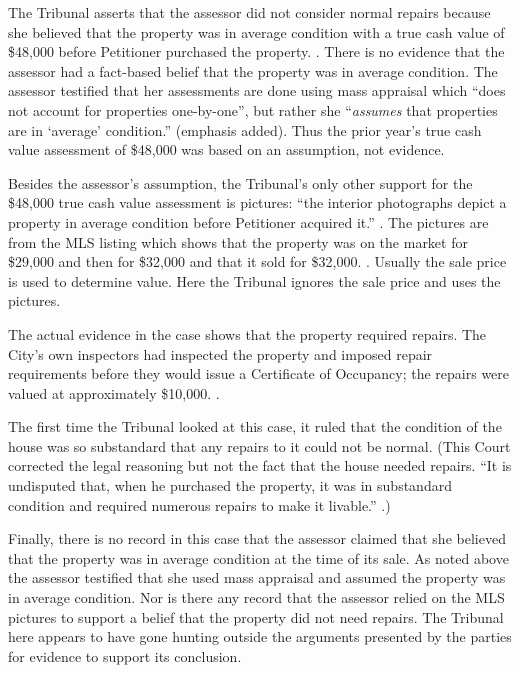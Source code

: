 \documentclass[12pt,\documentclassflag]{michiganCourtOfAppealsBrief}
\begin{document}
The Tribunal asserts that the assessor did not consider normal repairs because she believed that the property was in average condition with a true cash value of \$48,000 before Petitioner purchased the property. \reconsiderationDenied[2]. There is no evidence that the assessor had a fact-based belief that the property was in average condition. The assessor testified that her assessments are done using mass appraisal which ``does not account for properties one-by-one'', but rather she ``{\em assumes} that properties are in `average' condition.'' \foj[4] (emphasis added). Thus the prior year's true cash value assessment of \$48,000 was based on an assumption, not evidence.

Besides the assessor's assumption, the Tribunal's only other support for the \$48,000 true cash value assessment is pictures: ``the interior photographs depict a property in average condition before Petitioner acquired it.'' \reconsiderationDenied[2]. The pictures are from the MLS listing which shows that the property was on the market for \$29,000 and then for \$32,000 and that it sold for \$32,000. \mlsHistory[]. Usually the sale price is used to determine value. Here the Tribunal ignores the sale price and uses the pictures.

The actual evidence in the case shows that the property required repairs. The City's own inspectors had inspected the property and imposed repair requirements before they would issue a Certificate of Occupancy; the repairs were valued at approximately \$10,000. \repairs. 

The first time the Tribunal looked at this case, it ruled that the condition of the house was so substandard that any repairs to it could not be normal. (This Court corrected the legal reasoning but not the fact that the house needed repairs. ``It is undisputed that, when he purchased the property, it was in substandard condition and required numerous repairs to make it livable.'' .)

Finally, there is no record in this case that the assessor claimed that she believed that the property was in average condition at the time of its sale. As noted above the assessor testified that she used mass appraisal and assumed the property was in average condition. Nor is there any record that the assessor relied on the MLS pictures to support a belief that the property did not need repairs. The Tribunal here appears to have gone hunting outside the arguments presented by the parties for evidence to support its conclusion.
\end{document}
